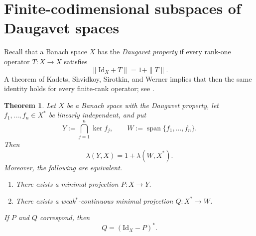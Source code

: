 \documentclass[11pt]{amsart}
\numberwithin{equation}{section}
\newtheorem{theorem}{Theorem}[section]
\theoremstyle{definition}
\theoremstyle{remark}
\newcommand{\Id}{\mathrm{Id}}
\DeclareMathOperator{\spanop}{span}
\begin{document}
\section{Finite-codimensional subspaces of Daugavet spaces}
\label{sec:daugavet}

Recall that a Banach space $X$ has the \emph{Daugavet property} if every rank-one operator $T\colon X\to X$ satisfies
\[
\|\Id_X+T\| = 1+\|T\|.
\]
A theorem of Kadets, Shvidkoy, Sirotkin, and Werner implies that then the same identity holds for every finite-rank operator; see \cite{KSSW}.

\begin{theorem}
\label{thm:daugavet-duality}
Let $X$ be a Banach space with the Daugavet property, let $f_1,\dots,f_n\in X^*$ be linearly independent, and put
\[
Y:=\bigcap_{j=1}^n \ker f_j,
\qquad
W:=\spanop\{f_1,\dots,f_n\}.
\]
Then
\[
\lambda(Y,X)=1+\lambda(W,X^*).
\]
Moreover, the following are equivalent.
\begin{enumerate}[label=\textup{(\roman*)}]
\item There exists a minimal projection $P\colon X\to Y$.
\item There exists a weak$^*$-continuous minimal projection $Q\colon X^*\to W$.
\end{enumerate}
If $P$ and $Q$ correspond, then
\[
Q=(\Id_X-P)^*.
\]
\end{theorem}
\end{document}
